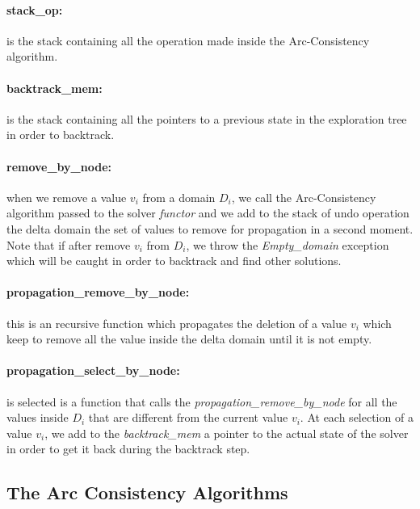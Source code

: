 \documentclass{rapport}
\begin{document}
\paragraph{stack\_op:} is the stack containing all the operation made inside the Arc-Consistency algorithm.

\paragraph{backtrack\_mem:} is the stack containing all the pointers to a previous state in the exploration tree in order to backtrack.

\paragraph{remove\_by\_node:} when we remove a value $v_i$ from a domain $D_i$, we call the Arc-Consistency algorithm passed to the solver \textit{functor} and we add to the stack of undo operation the delta domain the set of values to remove for propagation in a second moment. Note that if after remove $v_i$ from $D_i$, we throw the \textit{Empty\_domain} exception which will be caught in order to backtrack and find other solutions.

\paragraph{propagation\_remove\_by\_node:} this is an recursive function which propagates the deletion of a value $v_i$ which keep to remove all the value inside the delta domain until it is not empty.

\paragraph{propagation\_select\_by\_node:} is selected is a function that calls the \textit{propagation\_remove\_by\_node} for all the values inside $D_i$ that are different from the current value $v_i$. At each selection of a value $v_i$, we add to the \textit{backtrack\_mem} a pointer to the actual state of the solver in order to get it back during the backtrack step.

\subsection{The Arc Consistency Algorithms}

\end{document}

